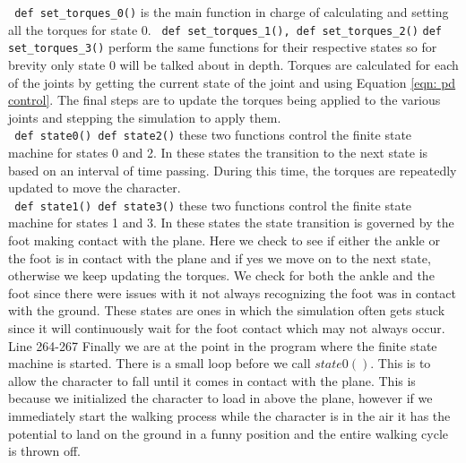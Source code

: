 \documentclass[12pt, a4paper]{article}
\begin{document}
\verb; def set_torques_0(); is the main function in charge of calculating and setting all the torques for state 0. \verb; def set_torques_1(), def set_torques_2(); \verb;def set_torques_3(); perform the same functions for their respective states so for brevity only state 0 will be talked about in depth. Torques are calculated for each of the joints by getting the current state of the joint and using Equation \ref{eqn: pd control}. The final steps are to update the torques being applied to the various joints and stepping the simulation to apply them.\\

\verb; def state0() def state2(); these two functions control the finite state machine for states 0 and 2. In these states the transition to the next state is based on an interval of time passing. During this time, the torques are repeatedly updated to move the character.\\

\verb; def state1() def state3(); these two functions control the finite state machine for states 1 and 3. In these states the state transition is governed by the foot making contact with the plane. Here we check to see if either the ankle or the foot is in contact with the plane and if yes we move on to the next state, otherwise we keep updating the torques. We check for both the ankle and the foot since there were issues with it not always recognizing the foot was in contact with the ground. These states are ones in which the simulation often gets stuck since it will continuously wait for the foot contact which may not always occur.\\

Line 264-267 Finally we are at the point in the program where the finite state machine is started. There is a small loop before we call $state0()$. This is to allow the character to fall until it comes in contact with the plane. This is because we initialized the character to load in above the plane, however if we immediately start the walking process while the character is in the air it has the potential to land on the ground in a funny position and the entire walking cycle is thrown off.
\end{document}
